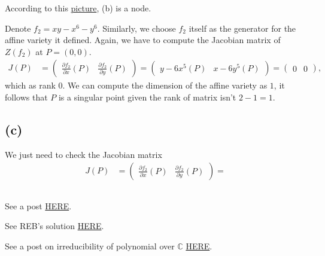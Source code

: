 According to this \href{https://www.desmos.com/calculator/c298mxdjtn}{picture}, (b) is a node.

Denote $f_2=xy-x^6-y^6$. Similarly, we choose $f_2$ itself as the generator for the affine variety it defined.
Again, we have to compute the Jacobian matrix of $Z(f_2)$ at $P=(0,0)$. 
\begin{align*}
    J(P) &= \begin{pmatrix}
        \frac{\partial f_2}{\partial x}(P) & \frac{\partial f_2}{\partial y}(P)
            \end{pmatrix}
        = \begin{pmatrix}
            y-6x^5 (P) & x-6y^5 (P)
        \end{pmatrix} 
        = \begin{pmatrix}
            0 & 0
        \end{pmatrix},
\end{align*}which as rank $0$. We can compute the dimension of the affine variety as $1$, it follows that $P$ is a singular point given the rank of matrix isn't $2-1=1$.

\subsection{(c)}

We just need to check the Jacobian matrix 
\begin{align*}
    J(P) &= \begin{pmatrix}
        \frac{\partial f_2}{\partial x}(P) & \frac{\partial f_2}{\partial y}(P)
            \end{pmatrix}
        = 
\end{align*}

\subsection{}

See a post \href{https://math.stackexchange.com/questions/1728013/is-the-affine-curve-y2-x4y4-in-mathbb-a2-singular}{HERE}.

See REB's solution \href{https://math.berkeley.edu/~reb/courses/256A/1.5.pdf}{HERE}.

See a post on irreducibility of polynomial over $\mathbb C$ \href{https://math.stackexchange.com/questions/1335827/showing-a-polynomial-is-irreducible-over-mathbbcx-y}{HERE}.